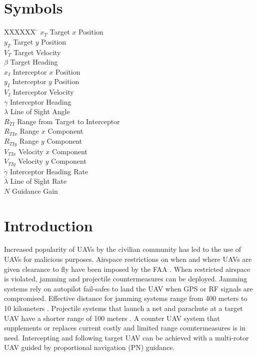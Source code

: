 \documentclass[]{aiaa-tc}%
\begin{document}
 \section*{Symbols}
\begin{tabbing}
 XXXXXX \= \kill%
 $x_T$ \> Target $x$ Position \\
 $y_T$ \> Target $y$ Position \\
 $V_T$ \> Target Velocity \\
 $\beta$ \> Target Heading \\
 $x_I$ \> Interceptor $x$ Position \\
 $y_I$ \> Interceptor $y$ Position \\
 $V_I$ \> Interceptor Velocity \\
 $\gamma$ \> Interceptor Heading \\
 $\lambda$ \> Line of Sight Angle \\
 $R_{TI}$ \> Range from Target to Interceptor \\
 $R_{TIx}$ \> Range $x$ Component \\
 $R_{TIy}$ \> Range $y$ Component \\
 $V_{TIx}$ \> Velocity $x$ Component \\
 $V_{TIy}$ \> Velocity $y$ Component \\
 $\dot{\gamma}$ \> Interceptor Heading Rate \\
 $\dot{\lambda}$ \> Line of Sight Rate \\
 $N$ \> Guidance Gain \\
 \end{tabbing}






\section{Introduction}

Increased popularity of UAVs by the civilian community has led to the use of UAVs for malicious purposes. Airspace restrictions on when and where UAVs are given clearance to fly have been imposed by the FAA \cite{federal_aviation_administration_2017}. When restricted airspace is violated, jamming and projectile countermeasures can be deployed. Jamming systems rely on autopilot fail-safes to land the UAV when GPS or RF signals are compromised. Effective distance for jamming systems range from 400 meters \cite{Battelle} to 10 kilometers \cite{Blighter}. Projectile systems that launch a net and parachute at a target UAV have a shorter range of 100 meters \cite{SkyWall}. A counter UAV system that supplements or replaces current costly and limited range countermeasures is in need. Intercepting and following target UAV can be achieved with a multi-rotor UAV guided by proportional navigation (PN) guidance.
\end{document}

